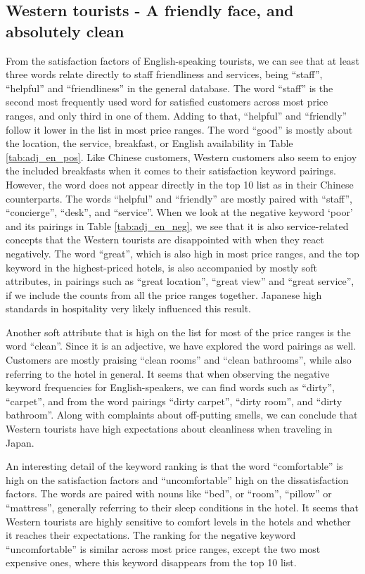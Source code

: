 \documentclass[smallextended,natbib]{svjour3}       %
\begin{document}
  \subsection{Western tourists - A friendly face, and absolutely clean}\label{disc:en}

    From the satisfaction factors of English-speaking tourists, we can see that at least three words relate directly to staff friendliness and services, being ``staff'', ``helpful'' and ``friendliness'' in the general database. The word ``staff'' is the second most frequently used word for satisfied customers across most price ranges, and only third in one of them. Adding to that, ``helpful'' and ``friendly'' follow it lower in the list in most price ranges. The word ``good'' is mostly about the location, the service, breakfast, or English availability in Table \ref{tab:adj_en_pos}. Like Chinese customers, Western customers also seem to enjoy the included breakfasts when it comes to their satisfaction keyword pairings. However, the word does not appear directly in the top 10 list as in their Chinese counterparts. The words ``helpful'' and ``friendly'' are mostly paired with ``staff'', ``concierge'', ``desk'', and ``service''. When we look at the negative keyword ‘poor’ and its pairings in Table \ref{tab:adj_en_neg}, we see that it is also service-related concepts that the Western tourists are disappointed with when they react negatively. The word ``great'', which is also high in most price ranges, and the top keyword in the highest-priced hotels, is also accompanied by mostly soft attributes, in pairings such as ``great location'', ``great view'' and ``great service'', if we include the counts from all the price ranges together. Japanese high standards in hospitality very likely influenced this result. 

    Another soft attribute that is high on the list for most of the price ranges is the word ``clean''. Since it is an adjective, we have explored the word pairings as well. Customers are mostly praising ``clean rooms'' and ``clean bathrooms'', while also referring to the hotel in general. It seems that when observing the negative keyword frequencies for English-speakers, we can find words such as ``dirty'', ``carpet'', and from the word pairings ``dirty carpet'', ``dirty room'', and ``dirty bathroom''. Along with complaints about off-putting smells, we can conclude that Western tourists have high expectations about cleanliness when traveling in Japan.

    An interesting detail of the keyword ranking is that the word ``comfortable'' is high on the satisfaction factors and ``uncomfortable'' high on the dissatisfaction factors. The words are paired with nouns like ``bed'', or ``room'', ``pillow'' or ``mattress'', generally referring to their sleep conditions in the hotel.
    It seems that Western tourists are highly sensitive to comfort levels in the hotels and whether it reaches their expectations. The ranking for the negative keyword ``uncomfortable'' is similar across most price ranges, except the two most expensive ones, where this keyword disappears from the top 10 list.
\end{document}
